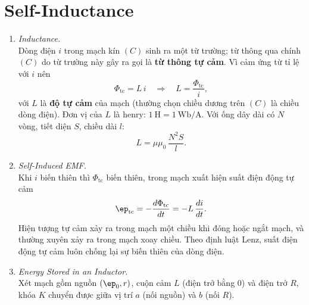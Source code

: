 \section{Self-Inductance}
\begin{enumerate}
\item \textit{Inductance.}\\
Dòng điện $i$ trong mạch kín $(C)$ sinh ra một từ trường; từ thông qua chính $(C)$ do từ trường này gây ra gọi là \textbf{từ thông tự cảm}. Vì cảm ứng từ tỉ lệ với $i$ nên
\[
\Phi_{\text{tc}} = L\,i
\quad\Rightarrow\quad
L = \frac{\Phi_{\text{tc}}}{i},
\]
với $L$ là \textbf{độ tự cảm} của mạch (thường chọn chiều dương trên $(C)$ là chiều dòng điện). Đơn vị của $L$ là henry: $1\ \text{H} = 1\ \text{Wb/A}$. Với ống dây dài có $N$ vòng, tiết diện $S$, chiều dài $l$:
\[
L = \mu\mu_0\,\frac{N^2 S}{l}.
\]

\item \textit{Self-Induced EMF.}\\
Khi $i$ biến thiên thì $\Phi_{\text{tc}}$ biến thiên, trong mạch xuất hiện suất điện động tự cảm
\[
\ep_{\text{tc}} = -\frac{d\Phi_{\text{tc}}}{dt} = -L\,\frac{di}{dt}.
\]
Hiện tượng tự cảm xảy ra trong mạch một chiều khi đóng hoặc ngắt mạch, và thường xuyên xảy ra trong mạch xoay chiều. Theo định luật Lenz, suất điện động tự cảm luôn chống lại sự biến thiên của dòng điện.

\item \textit{Energy Stored in an Inductor.}\\
Xét mạch gồm nguồn $(\ep_0, r)$, cuộn cảm $L$ (điện trở bằng 0) và điện trở $R$, khóa $K$ chuyển được giữa vị trí $a$ (nối nguồn) và $b$ (nối $R$).
\begin{figure}[htbp]
    \centering
\end{figure}


\end{enumerate}
